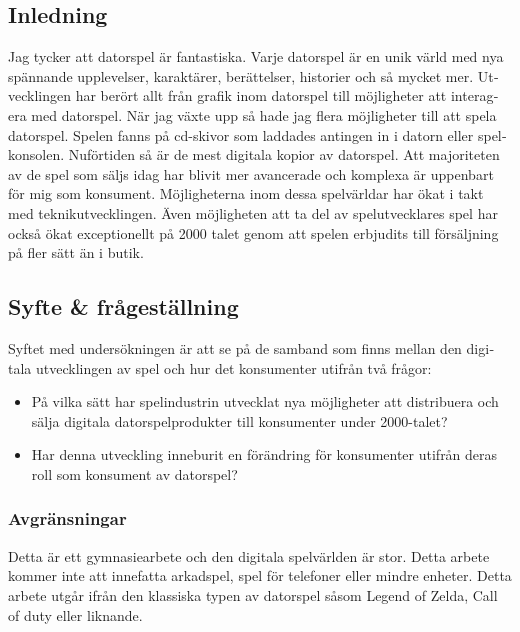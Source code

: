 \documentclass[11p]{article}
\begin{document}
    \begin{otherlanguage}{swedish}
        \section{Inledning}
        Jag tycker att datorspel är fantastiska.
        Varje datorspel är en unik värld med nya spännande upplevelser, karaktärer, berättelser, historier och så mycket mer.
        Utvecklingen har berört allt från grafik inom datorspel till möjligheter att interagera med datorspel.
        När jag växte upp så hade jag flera möjligheter till att spela datorspel.
        Spelen fanns på cd-skivor som laddades antingen in i datorn eller spelkonsolen.
        Nuförtiden så är de mest digitala kopior av datorspel.
        Att majoriteten av de spel som säljs idag har blivit mer avancerade och komplexa är uppenbart för mig som konsument.
        Möjligheterna inom dessa spelvärldar har ökat i takt med teknikutvecklingen.
        Även möjligheten att ta del av spelutvecklares spel har också ökat exceptionellt på 2000 talet genom att spelen erbjudits till försäljning på fler sätt än i butik.
        \subsection{Syfte \& frågeställning}

        Syftet med undersökningen är att se på de samband som finns mellan den digitala utvecklingen av spel och hur det konsumenter utifrån två frågor:

        \begin{itemize}

            \item På vilka sätt har spelindustrin utvecklat nya möjligheter att distribuera och sälja digitala datorspelprodukter till konsumenter under 2000-talet?

            \item Har denna utveckling inneburit en förändring för konsumenter utifrån deras roll som konsument av datorspel?

        \end{itemize}

        \subsubsection{Avgränsningar}
        Detta är ett gymnasiearbete och den digitala spelvärlden är stor.
        Detta arbete kommer inte att innefatta arkadspel, spel för telefoner eller mindre enheter.
        Detta arbete utgår ifrån den klassiska typen av datorspel såsom Legend of Zelda, Call of duty eller liknande.  %



\end{otherlanguage}
\end{document}
